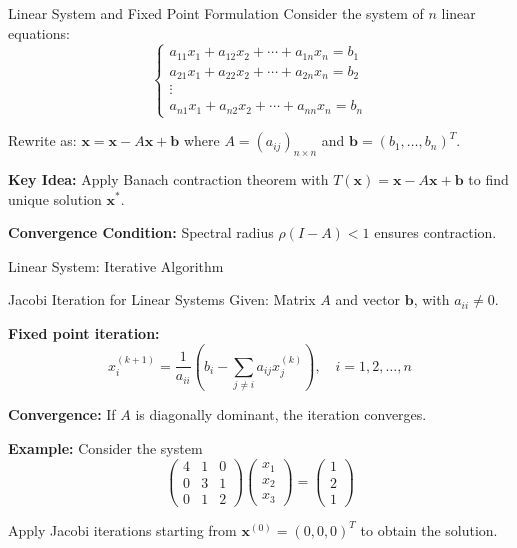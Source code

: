 \documentclass[aspectratio=169,10pt]{beamer}
\begin{document}
\begin{frame}[fragile]{Linear System and Fixed Point Formulation}
    Consider the system of $n$ linear equations:
    \[
    \begin{cases}
    a_{11}x_1 + a_{12}x_2 + \cdots + a_{1n}x_n = b_1 \\
    a_{21}x_1 + a_{22}x_2 + \cdots + a_{2n}x_n = b_2 \\
    \vdots \\
    a_{n1}x_1 + a_{n2}x_2 + \cdots + a_{nn}x_n = b_n
    \end{cases}
    \]

    Rewrite as: $\mathbf{x} = \mathbf{x} - A\mathbf{x} + \mathbf{b}$ where $A = (a_{ij})_{n \times n}$ and $\mathbf{b} = (b_1, \ldots, b_n)^T$.

    \vspace{0.3cm}

    \textbf{Key Idea:} Apply Banach contraction theorem with $T(\mathbf{x}) = \mathbf{x} - A\mathbf{x} + \mathbf{b}$ to find unique solution $\mathbf{x}^*$.

    \vspace{0.3cm}

    \textbf{Convergence Condition:} Spectral radius $\rho(I - A) < 1$ ensures contraction.
\end{frame}

\begin{frame}[fragile]{Linear System: Iterative Algorithm}
    \begin{block}{Jacobi Iteration for Linear Systems}
        Given: Matrix $A$ and vector $\mathbf{b}$, with $a_{ii} \neq 0$.

        \smallskip
        \textbf{Fixed point iteration:}
        \[x_i^{(k+1)} = \frac{1}{a_{ii}}\left(b_i - \sum_{j \neq i} a_{ij} x_j^{(k)}\right), \quad i = 1,2,\ldots,n\]

        \smallskip
        \textbf{Convergence:} If $A$ is diagonally dominant, the iteration converges.
    \end{block}

    \vspace{0.4cm}

    \textbf{Example:} Consider the system
    \[
    \begin{pmatrix} 4 & 1 & 0 \\ 0 & 3 & 1 \\ 0 & 1 & 2 \end{pmatrix}
    \begin{pmatrix} x_1 \\ x_2 \\ x_3 \end{pmatrix}
    =
    \begin{pmatrix} 1 \\ 2 \\ 1 \end{pmatrix}
    \]

    Apply Jacobi iterations starting from $\mathbf{x}^{(0)} = (0,0,0)^T$ to obtain the solution.
\end{frame}
\end{document}
